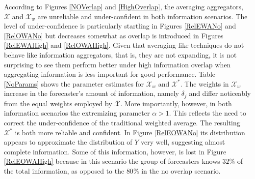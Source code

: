 \documentclass[11pt]{article}
\theoremstyle{definition}
\theoremstyle{definition}
\begin{document}
According to Figures \ref{NOVerlap} and  \ref{HighOverlap}, the averaging aggregators, $\bar{\mathcal{X}}$ and $\mathcal{X}_w$ are unreliable and under-confident in both information scenarios. The level of under-confidence is particularly startling in Figures \ref{RelEWANo} and \ref{RelOWANo} but decreases somewhat as overlap is introduced in Figures \ref{RelEWAHigh} and \ref{RelOWAHigh}. Given that averaging-like techniques do not behave like information aggregators, that is, they are not expanding, it is not surprising to see them perform better under high information overlap when aggregating information is less important for good performance. Table \ref{NoParams} shows the parameter estimates for $\mathcal{X}_w$ and $\mathcal{X}^*$.  The weights in $\mathcal{X}_w$ increase in the forecaster's amount of information, namely $\delta_j$ and differ noticeably from the equal weights employed by $\bar{\mathcal{X}}$. 
More importantly, however, in both information scenarios the extremizing parameter $\alpha > 1$. This reflects the need to correct the under-confidence of the traditional weighted average. The resulting $\mathcal{X}^*$ is both more reliable and confident.  In Figure \ref{RelEOWANo} its distribution appears to approximate the distribution of $Y$ very well, suggesting  almost complete information. Some of this information, however, is lost in Figure \ref{RelEOWAHigh} because in this scenario the group of forecasters knows $32\%$ of the total information, as opposed to the $80\%$ in the no overlap scenario.


\end{document}
